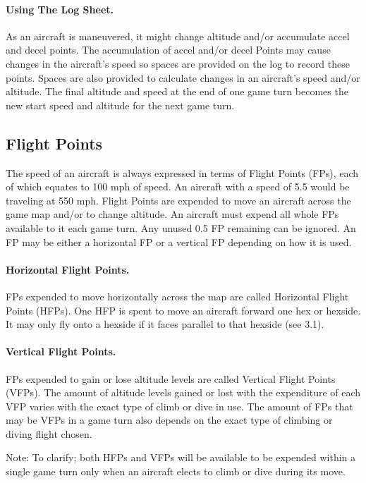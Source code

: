 \paragraph{Using The Log Sheet.} As an aircraft is maneuvered, it might change altitude and/or accumulate accel and decel points. The accumulation of accel and/or decel Points may cause changes in the aircraft's speed so spaces are provided on the log to record these points. Spaces are also provided to calculate changes in an aircraft's speed and/or altitude. The final altitude and speed at the end of one game turn becomes the new start speed and altitude for the next game turn.

\subsection{Flight Points}

The speed of an aircraft is always expressed in terms of Flight Points (FPs), each of which equates to 100 mph of speed. An aircraft with a speed of 5.5 would be traveling at 550 mph. Flight Points are expended to move an aircraft across the game map and/or to change altitude.  An aircraft must expend all whole FPs available to it each game turn. Any unused 0.5 FP remaining can be ignored. An FP may be either a horizontal FP or a vertical FP depending on how it is used.

\paragraph{Horizontal Flight Points.} FPs expended to move horizontally across the map are called Horizontal Flight Points (HFPs). One HFP is spent to move an aircraft forward one hex or hexside. It may only fly onto a hexside if it faces parallel to that hexside (see 3.1).

\paragraph{Vertical Flight Points.} FPs expended to gain or lose altitude levels are called Vertical Flight Points (VFPs). The amount of altitude levels gained or lost with the expenditure of each VFP varies with the exact type of climb or dive in use.  The amount of FPs that may be VFPs in a game turn also depends on the exact type of climbing or diving flight chosen.

Note: To clarify; both HFPs and VFPs will be available to be expended within a single game turn only when an aircraft elects to climb or dive during its move.

